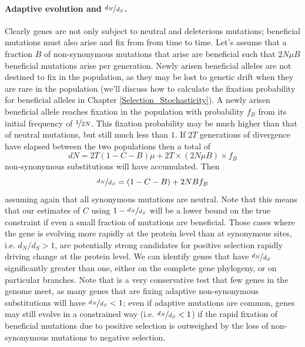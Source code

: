 \paragraph{Adaptive evolution and $\nicefrac{d_N}{d_S}$.}
Clearly genes are not only subject to neutral and deleterious mutations; beneficial mutations must also arise and fix from from time to time.
Let's assume that a fraction $B$ of non-synonymous mutations that arise are
beneficial such that $2 N \mu B$ beneficial mutations arise per generation. Newly arisen beneficial alleles are not destined to fix in the population, as they may be lost to genetic drift when they are rare in the population (we'll
discuss how to calculate the fixation probability for beneficial
alleles in Chapter \ref{Selection_Stochasticity}). A newly arisen beneficial allele reaches fixation in the population with probability $f_B$ from its initial frequency of $\nicefrac{1}{2N}$. This fixation
probability may be much higher than that of neutral mutations, but still much less than $1$.  If $2T$ generations of divergence have
elapsed between the two populations then a total of
\begin{equation}
dN=2T (1-C - B) \mu  + 2T \times (2 N \mu B) \times  f_B
\end{equation}
non-synonymous substitutions will have accumulated.
Then
\begin{equation}
\nicefrac{d_N}{d_S} = (1-C-B) +  2 N B f_B
\end{equation}
assuming again that all synonymous mutations are neutral. Note that this means that our estimates of $C$ using $1-\nicefrac{d_N}{d_S}$ will be
a  lower bound on the true constraint if even a small fraction of
mutations are beneficial. Those cases where the gene is evolving more rapidly at the protein level than at synonymous
sites, i.e. $d_N/d_S > 1$, are potentially strong candidates for  positive selection rapidly driving change at the protein level. We can identify genes that have $\nicefrac{d_N}{d_S}$ significantly greater than one, either on the complete gene phylogeny, or on particular branches. Note that is a very conservative test that few genes in the genome meet, as many genes that are fixing adaptive non-synonymous substitutions will have $\nicefrac{d_N}{d_S}<1$;  even if adaptive mutations are common, genes may still evolve in a constrained way (i.e. $\nicefrac{d_N}{d_S}<1$) if
the rapid fixation of beneficial mutations due to positive selection is outweighed by the loss of non-synonymous mutations to negative selection.


